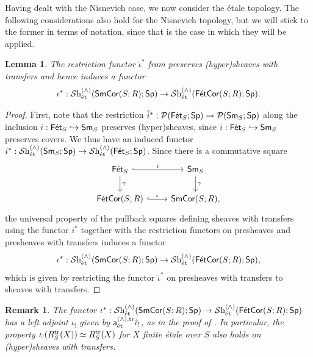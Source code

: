 \documentclass[reqno]{amsart}
\numberwithin{equation}{section}\theoremstyle{thms}
\newtheorem{lem}[equation]{Lemma}
\theoremstyle{defn}
\newtheorem{rem}[equation]{Remark}
\newcommand{\cP}{\mathcal{P}}
\newcommand{\tn}[1]{\textnormal{#1}}
\newcommand{\tsf}[1]{\textsf{\textup{#1}}}
\newcommand{\mcal}[1]{\mathcal{#1}}
\newcommand{\sheaves}{\mcal{S}\tn{h}}
\newcommand{\spec}{\tsf{Sp}}
\newcommand{\sms}{\tsf{Sm}_S}
\newcommand{\fets}{\tsf{Fét}_S}
\newcommand{\corsms}[1]{\tsf{SmCor}(S;#1)}
\newcommand{\corfets}[1]{\tsf{FétCor}(S;#1)}
\begin{document}
Having dealt with the Nisnevich case, we now consider the étale topology. The following considerations also hold for the Nisnevich topology, but we will stick to the former in terms of notation, since that is the case in which they will be applied.

\begin{lem}\label{lem:restrictionsheaves}
The restriction functor $\hat{\iota}^*$ from  preserves (hyper)sheaves with transfers and hence induces a functor 
$$\iota^*: \sheaves^{(\wedge)}_{\tn{ét}}(\corsms{R};\spec) \to \sheaves^{(\wedge)}_{\tn{ét}}(\corfets{R};\spec).$$
\end{lem}
\begin{proof}
First, note that the restriction $\hat{i}^*:\cP(\fets;\spec) \to \cP(\sms;\spec)$ along the inclusion $i: \fets \hookrightarrow \sms$ preserves (hyper)sheaves, since $i: \fets \hookrightarrow \sms$ preserves covers. We thus have an induced functor $i^*: \sheaves^{(\wedge)}_{\tn{ét}}(\sms;\spec) \to \sheaves^{(\wedge)}_{\tn{ét}}(\fets;\spec)$. Since there is a commutative square
\[\begin{tikzcd}
	\fets & \sms \\
	\corfets{R} & \corsms{R},
	\arrow["i", hook, from=1-1, to=1-2]
	\arrow["\gamma", from=1-1, to=2-1]
	\arrow["\gamma", from=1-2, to=2-2]
	\arrow["\iota", hook, from=2-1, to=2-2]
\end{tikzcd}\]
the universal property of the pullback squares defining sheaves with transfers using the functor $i^*$ together with the restriction functors on presheaves and presheaves with transfers induces a functor 
$$\iota^*: \sheaves^{(\wedge)}_{\tn{ét}}(\corsms{R};\spec) \to \sheaves^{(\wedge)}_{\tn{ét}}(\corfets{R};\spec),$$ which is given by restricting the functor $\hat{\iota}^*$ on presheaves with transfers to sheaves with transfers.
\end{proof}

\begin{rem}
The functor $\iota^*: \sheaves^{(\wedge)}_{\tn{ét}}(\corsms{R};\spec) \to \sheaves^{(\wedge)}_{\tn{ét}}(\corfets{R};\spec)$ has a left adjoint $\iota_!$ given by $\tsf{a}_{\tn{ét}}^{(\wedge), \tn{tr}} \hat{\iota}_!$, as in the proof of . In particular, the property $\iota_!(R^{\tn{tr}}_S(X)) \simeq R^{\tn{tr}}_S(X)$ for $X$ finite étale over $S$ also holds on (hyper)sheaves with transfers.
\end{rem}
\end{document}
